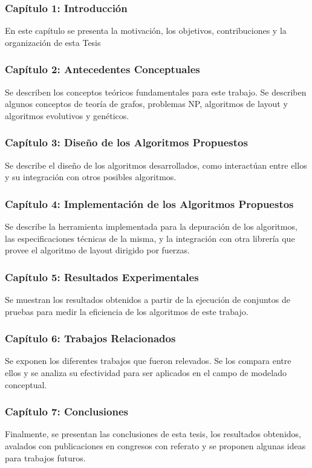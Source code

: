 \subsubsection{Capítulo 1: Introducción}
En este capítulo se presenta la motivación, los objetivos, contribuciones y la organización de esta Tesis

\subsubsection{Capítulo 2: Antecedentes Conceptuales}
Se describen los conceptos teóricos fundamentales para este trabajo. Se describen algunos conceptos de teoría de grafos, problemas NP, algoritmos de layout y algoritmos evolutivos y genéticos.

\subsubsection{Capítulo 3: Diseño de los Algoritmos Propuestos}
Se describe el diseño de los algoritmos desarrollados, como interactúan entre ellos y su integración con otros posibles algoritmos.

\subsubsection{Capítulo 4: Implementación de los Algoritmos Propuestos}
Se describe la herramienta implementada para la depuración de los algoritmos, las especificaciones técnicas de la misma, y la integración con otra librería que provee el algoritmo de layout dirigido por fuerzas.

\subsubsection{Capítulo 5: Resultados Experimentales}
Se muestran los resultados obtenidos a partir de la ejecución de conjuntos de pruebas para medir la eficiencia de los algoritmos de este trabajo.

\subsubsection{Capítulo 6: Trabajos Relacionados}
Se exponen los diferentes trabajos que fueron relevados. Se los compara entre ellos y se analiza su efectividad para ser aplicados en el campo de modelado conceptual.

\subsubsection{Capítulo 7: Conclusiones}
 Finalmente, se presentan las conclusiones de esta tesis, los resultados obtenidos, avalados con publicaciones en congresos con referato y se proponen algunas ideas para trabajos futuros.

